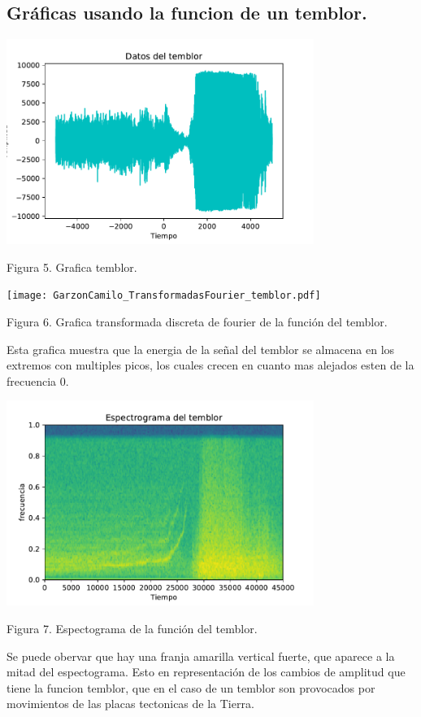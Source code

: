 \documentclass{article}
\begin{document}
\subsection{    Gráficas usando la funcion de un temblor.} 
\vspace{5mm}
\begin{center}
\includegraphics[width=10cm]{GarzonCamilo_temblor.pdf} 

Figura 5. Grafica temblor.

\texttt{[image: GarzonCamilo\_TransformadasFourier\_temblor.pdf]} 

Figura 6. Grafica transformada discreta de fourier de la función del temblor.

\begin{flushleft}
Esta grafica muestra que la energia de la señal del temblor se almacena en los extremos con multiples picos, los cuales crecen en cuanto mas alejados esten de la frecuencia 0.
\end{flushleft}
\includegraphics[width=10cm]{GarzonCamilo_espectograma_temblor.pdf} 

Figura 7. Espectograma de la función del temblor.
\begin{flushleft}
Se puede obervar que hay una franja amarilla vertical fuerte, que aparece a la mitad del espectograma. Esto en representación de los cambios de amplitud que tiene la funcion temblor, que en el caso de un temblor son provocados por movimientos de las placas tectonicas de la Tierra.
\end{flushleft}
\end{center}
\end{document}
